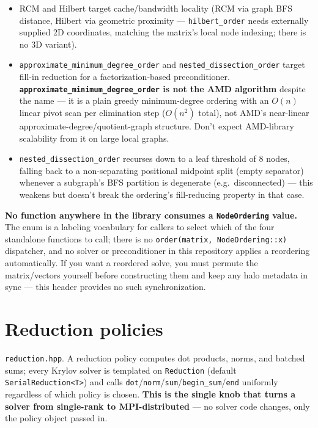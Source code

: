 \documentclass[11pt,a4paper]{report}
\begin{document}
\begin{itemize}
\item RCM and Hilbert target cache/bandwidth locality (RCM via graph BFS
  distance, Hilbert via geometric proximity --- \lstinline!hilbert_order! needs
  externally supplied 2D coordinates, matching the matrix's local node
  indexing; there is no 3D variant).
\item \lstinline!approximate_minimum_degree_order! and \lstinline!nested_dissection_order!
  target fill-in reduction for a factorization-based preconditioner.
  \textbf{\lstinline!approximate_minimum_degree_order! is not the AMD
  algorithm} despite the name --- it is a plain greedy minimum-degree
  ordering with an $O(n)$ linear pivot scan per elimination step
  ($O(n^2)$ total), not AMD's near-linear approximate-degree/quotient-graph
  structure. Don't expect AMD-library scalability from it on large local
  graphs.
\item \lstinline!nested_dissection_order! recurses down to a leaf threshold of
  8 nodes, falling back to a non-separating positional midpoint split
  (empty separator) whenever a subgraph's BFS partition is degenerate
  (e.g.\ disconnected) --- this weakens but doesn't break the ordering's
  fill-reducing property in that case.
\end{itemize}

\textbf{No function anywhere in the library consumes a \lstinline!NodeOrdering!
value.} The enum is a labeling vocabulary for callers to select which of
the four standalone functions to call; there is no
\lstinline!order(matrix, NodeOrdering::x)! dispatcher, and no solver or
preconditioner in this repository applies a reordering automatically. If
you want a reordered solve, you must permute the matrix/vectors yourself
before constructing them and keep any halo metadata in sync --- this
header provides no such synchronization.

\section{Reduction policies}
\label{sec:4.4}

\texttt{reduction.hpp}. A reduction policy computes dot products, norms,
and batched sums; every Krylov solver is templated on \lstinline!Reduction!
(default \lstinline!SerialReduction<T>!) and calls
\lstinline!dot!/\lstinline!norm!/\lstinline!sum!/\lstinline!begin_sum!/\lstinline!end! uniformly regardless
of which policy is chosen. \textbf{This is the single knob that turns a
solver from single-rank to MPI-distributed} --- no solver code changes,
only the policy object passed in.
\end{document}
